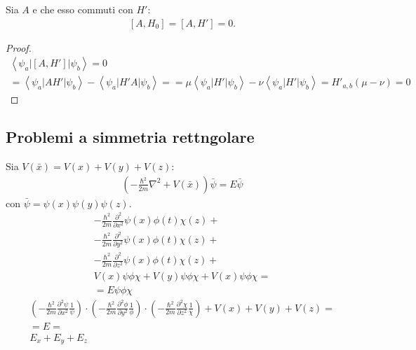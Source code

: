 
\begin{teorema}
Sia $A$ e che esso commuti con $H'$:
\begin{equation}\begin{split}
\left[A,H_0\right]=\left[A,H'\right]=0.
\end{split}\end{equation}
\end{teorema}
\begin{proof}
\begin{equation}\begin{split}
\left\langle \psi _a|\left[A,H'\right]|\psi _b \right\rangle=0 \\
=\left\langle \psi _a|AH'|\psi _b \right\rangle-\left\langle \psi _a|H'A|\psi _b \right\rangle=
=\mu\left\langle \psi _a|H'|\psi _b \right\rangle-\nu\left\langle \psi _a|H'|\psi _b \right\rangle=H'_{a,b}\left(\mu-\nu\right)=0
\end{split}\end{equation}
\end{proof}

\subsection{Problemi a simmetria rettngolare} %
Sia $V\left(\bar x\right)=V\left(x\right)+V\left(y\right)+V\left(z\right)$:
\begin{equation}\begin{split}
\left(-\frac{\hbar ^2}{2m}\nabla ^2+V\left(\bar x\right)\right)\bar \psi =E\bar \psi 
\end{split}\end{equation}
con $\bar \psi =\psi \left(x\right)\psi \left(y\right)\psi \left(z\right)$.
\begin{equation}\begin{split}
-\frac{\hbar ^2}{2m}\frac{\partial ^2}{\partial x^2}\psi \left(x\right)\phi \left(t\right)\chi \left(z\right)+\\
-\frac{\hbar ^2}{2m}\frac{\partial ^2}{\partial y^2}\psi \left(x\right)\phi \left(t\right)\chi \left(z\right)+\\
-\frac{\hbar ^2}{2m}\frac{\partial ^2}{\partial z^2}\psi \left(x\right)\phi \left(t\right)\chi \left(z\right)+\\
V\left(x\right)\psi \phi\chi+V\left(y\right)\psi \phi\chi+V\left(x\right)\psi \phi\chi=\\
=E\psi \phi\chi
\end{split}\end{equation}
\begin{equation}\begin{split}
\left(-\frac{\hbar ^2}{2m}\frac{\partial ^2\psi }{\partial x^2}\frac{1}{\psi }\right)\cdot \left(-\frac{\hbar ^2}{2m}\frac{\partial ^2\phi }{\partial y^2}\frac{1}{\phi }\right)\cdot \left(-\frac{\hbar ^2}{2m}\frac{\partial ^2\chi }{\partial z^2}\frac{1}{\chi }\right)+V\left(x\right)+V\left(y\right)+V\left(z\right)=\\
=E=\\
E_x+E_y+E_z
\end{split}\end{equation}


